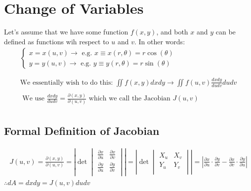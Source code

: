 \documentclass{article}
\begin{document}
\section{Change of Variables}
Let's assume that we have some function $f(x,y)$, and both $x$ and $y$ can be defined as functions wih respect to $u$ and $v$. In other words:
\[
\begin{aligned}
\begin{cases}
x = x(u,v) \to \text{ e.g. } x \equiv x(r, \theta) = r \cos(\theta) \\
y = y(u,v) \to \text{ e.g. } y \equiv y(r, \theta) = r \sin(\theta)
\end{cases}\\\\\\
\text{We essentially wish to do this: }
\iint f(x,y) dxdy \to \iint f(u,v) \frac{dxdy}{dudv}dudv\\\\
\text{ We use } \frac{dxdy}{dudv} = \frac{\partial (x,y)}{\partial (u,v)} \text{ which we call the Jacobian } J(u,v)\\
\end{aligned}
\]

    \subsection{Formal Definition of Jacobian}
    \begin{equation}
    \begin{aligned}
        J(u,v) = \frac{\partial (x,y)}{\partial (u,v)} = 
        \left\lvert
        \det
        \begin{vmatrix}
        \frac{\partial x}{\partial u} & \frac{\partial x}{\partial v}\\
        \frac{\partial y}{\partial u} & \frac{\partial y}{\partial v}\\
        \end{vmatrix}\right\rvert = 
        \left\lvert
        \det
        \begin{vmatrix}
        X_u & X_v \\
        Y_u & Y_v \\
        \end{vmatrix}
        \right\rvert = 
        \left\lvert
        \frac{\partial x}{\partial u}\cdot\frac{\partial y}{\partial v} - \frac{\partial x}{\partial v}\cdot\frac{\partial y}{\partial u}
        \right\rvert
    \end{aligned}
    \end{equation}
    $\therefore dA = dxdy = J(u,v)dudv$
\end{document}
